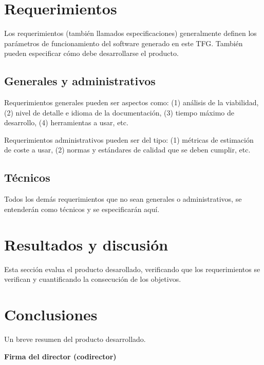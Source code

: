 \documentclass[titlepage, 12pt, a4paper, oneside]{article}
\begin{document}
\section{Requerimientos}
Los requerimientos (también llamados especificaciones) generalmente
definen los parámetros de funcionamiento del software generado en este
TFG. También pueden especificar cómo debe desarrollarse el producto.

\subsection{Generales y administrativos}
Requerimientos generales pueden ser aspectos como: (1) análisis de la
viabilidad, (2) nivel de detalle e idioma de la documentación, (3) tiempo
máximo de desarrollo, (4) herramientas a usar, etc.

Requerimientos administrativos pueden ser del tipo: (1) métricas de
estimación de coste a usar, (2) normas y estándares de calidad que se
deben cumplir, etc.

\subsection{Técnicos}
Todos los demás requerimientos que no sean generales o
administrativos, se entenderán como técnicos y se especificarán aquí.

\section{Resultados y discusión}
Esta sección evalua el producto desarollado, verificando que los
requerimientos se verifican y cuantificando la consecución de los
objetivos.

\section{Conclusiones}
Un breve resumen del producto desarrollado.




\begin{center}
  \textbf{Firma del director (codirector)}
\end{center}
\end{document}
